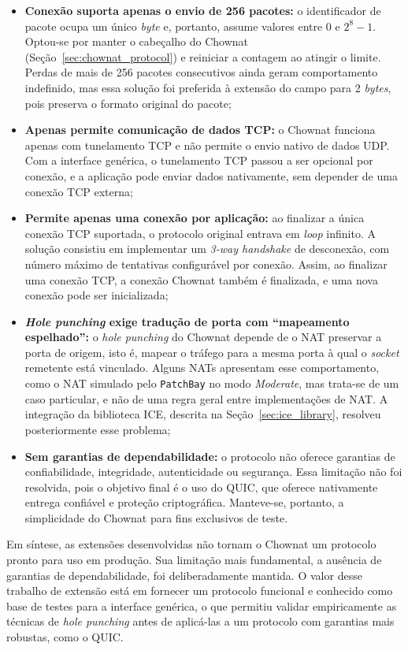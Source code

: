 \begin{itemize}
    \item \textbf{Conexão suporta apenas o envio de 256 pacotes:} o identificador de pacote ocupa um único \textit{byte} e, portanto, assume valores entre 0 e $2^8-1$. Optou-se por manter o cabeçalho do Chownat (Seção~\ref{sec:chownat_protocol}) e reiniciar a contagem ao atingir o limite. Perdas de mais de 256 pacotes consecutivos ainda geram comportamento indefinido, mas essa solução foi preferida à extensão do campo para 2 \textit{bytes}, pois preserva o formato original do pacote;
    \item \textbf{Apenas permite comunicação de dados TCP:} o Chownat funciona apenas com tunelamento TCP e não permite o envio nativo de dados UDP. Com a interface genérica, o tunelamento TCP passou a ser opcional por conexão, e a aplicação pode enviar dados nativamente, sem depender de uma conexão TCP externa;
    \item \textbf{Permite apenas uma conexão por aplicação:} ao finalizar a única conexão TCP suportada, o protocolo original entrava em \textit{loop} infinito. A solução consistiu em implementar um \textit{3-way handshake} de desconexão, com número máximo de tentativas configurável por conexão. Assim, ao finalizar uma conexão TCP, a conexão Chownat também é finalizada, e uma nova conexão pode ser inicializada;
    \item \textbf{\textit{Hole punching} exige tradução de porta com ``mapeamento espelhado'':} o \textit{hole punching} do Chownat depende de o NAT preservar a porta de origem, isto é, mapear o tráfego para a mesma porta à qual o \textit{socket} remetente está vinculado. Alguns NATs apresentam esse comportamento, como o NAT simulado pelo \texttt{PatchBay} \citep{patchbay} no modo \textit{Moderate}, mas trata-se de um caso particular, e não de uma regra geral entre implementações de NAT. A integração da biblioteca ICE, descrita na Seção~\ref{sec:ice_library}, resolveu posteriormente esse problema;
    \item \textbf{Sem garantias de dependabilidade:} o protocolo não oferece garantias de confiabilidade, integridade, autenticidade ou segurança. Essa limitação não foi resolvida, pois o objetivo final é o uso do QUIC, que oferece nativamente entrega confiável e proteção criptográfica. Manteve-se, portanto, a simplicidade do Chownat para fins exclusivos de teste.
\end{itemize}

Em síntese, as extensões desenvolvidas não tornam o Chownat um protocolo pronto para uso em produção. Sua limitação mais fundamental, a ausência de garantias de dependabilidade, foi deliberadamente mantida. O valor desse trabalho de extensão está em fornecer um protocolo funcional e conhecido como base de testes para a interface genérica, o que permitiu validar empiricamente as técnicas de \textit{hole punching} antes de aplicá-las a um protocolo com garantias mais robustas, como o QUIC.

